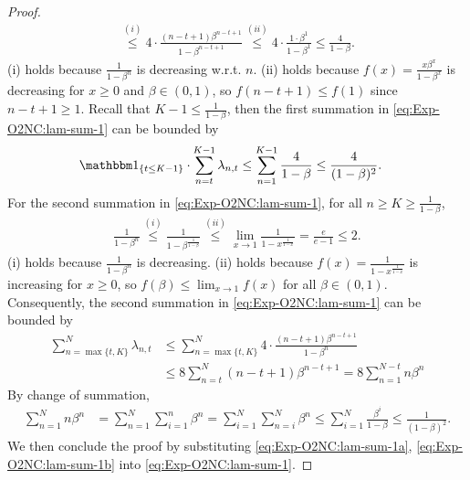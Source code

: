 \begin{proof}
\begin{align*}
    \stackrel{(i)}{\le} 4\cdot \frac{(n-t+1)\beta^{n-t+1}}{1-\beta^{n-t+1}}
    \stackrel{(ii)}{\le} 4\cdot \frac{1\cdot \beta^1}{1-\beta^1} \le \frac{4}{1-\beta}.
\end{align*}
(i) holds because $\frac{1}{1-\beta^n}$ is decreasing w.r.t. $n$. (ii) holds because $f(x)=\frac{x\beta^x}{1-\beta^x}$ is decreasing for $x\ge 0$ and $\beta\in(0,1)$, so $f(n-t+1) \le f(1)$ since $n-t+1 \ge 1$.
Recall that $K-1\le \frac{1}{1-\beta}$, then the first summation in \eqref{eq:Exp-O2NC:lam-sum-1} can be bounded by
\begin{align}
    \one_{\{t\le K-1\}}\cdot \sum_{n=t}^{K-1} \lambda_{n,t}
    &\le \sum_{n=1}^{K-1} \frac{4}{1-\beta} \le \frac{4}{(1-\beta)^2}.
    \label{eq:Exp-O2NC:lam-sum-1a}
\end{align}
For the second summation in \eqref{eq:Exp-O2NC:lam-sum-1}, for all $n\ge K \ge \frac{1}{1-\beta}$, 
\begin{align*}
    \frac{1}{1-\beta^n} 
    \stackrel{(i)}{\le} \frac{1}{1-\beta^{\frac{1}{1-\beta}}} 
    \stackrel{(ii)}{\le} \lim_{x\to 1} \frac{1}{1-x^{\frac{1}{1-x}}} = \frac{e}{e-1} \le 2.
\end{align*}
(i) holds because $\frac{1}{1-\beta^n}$ is decreasing. (ii) holds because $f(x)=\frac{1}{1-x^{\frac{1}{1-x}}}$ is increasing for $x\ge 0$, so $f(\beta) \le \lim_{x\to 1}f(x)$ for all $\beta\in(0,1)$. Consequently, the second summation in \eqref{eq:Exp-O2NC:lam-sum-1} can be bounded by
\begin{align}
    \sum_{n=\max\{t,K\}}^N \lambda_{n,t}
    &\le \sum_{n=\max\{t,K\}}^N 4\cdot \frac{(n-t+1)\beta^{n-t+1}}{1-\beta^n} \\
    &\le 8\sum_{n=t}^N (n-t+1)\beta^{n-t+1} 
    = 8\sum_{n=1}^{N-t} n\beta^n
    \label{eq:Exp-O2NC:lam-sum-1b}
\end{align}
By change of summation,
\begin{align*}
    \sum_{n=1}^N n\beta^n
    &= \sum_{n=1}^N \sum_{i=1}^n \beta^n 
    = \sum_{i=1}^N \sum_{n=i}^N \beta^n
    \le \sum_{i=1}^N \frac{\beta^i}{1-\beta}
    \le \frac{1}{(1-\beta)^2}.
\end{align*}
We then conclude the proof by substituting \eqref{eq:Exp-O2NC:lam-sum-1a}, \eqref{eq:Exp-O2NC:lam-sum-1b} into \eqref{eq:Exp-O2NC:lam-sum-1}.
\end{proof}

\VarianceToRegularizer*

